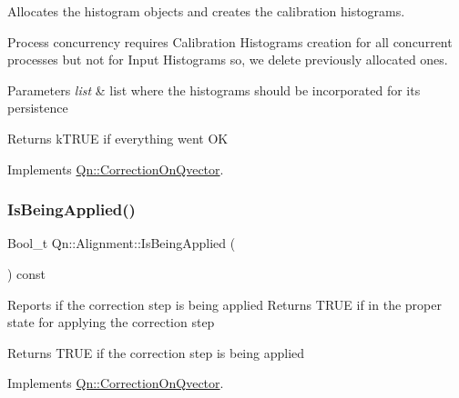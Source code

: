 Allocates the histogram objects and creates the calibration histograms.

Process concurrency requires Calibration Histograms creation for all concurrent processes but not for Input Histograms so, we delete previously allocated ones. 
\begin{DoxyParams}{Parameters}
{\em list} & list where the histograms should be incorporated for its persistence \\
\hline
\end{DoxyParams}
\begin{DoxyReturn}{Returns}
k\+T\+R\+UE if everything went OK 
\end{DoxyReturn}


Implements \mbox{\hyperlink{classQn_1_1CorrectionOnQvector_addcdd98787c99ea34a2511be2cdc8de4}{Qn\+::\+Correction\+On\+Qvector}}.

\mbox{\label{classQn_1_1Alignment_aaa38151d72ebf1aa97247ba07c4d16e5}} 
\subsubsection{\texorpdfstring{Is\+Being\+Applied()}{IsBeingApplied()}}
{\footnotesize\ttfamily Bool\+\_\+t Qn\+::\+Alignment\+::\+Is\+Being\+Applied (\begin{DoxyParamCaption}{ }\end{DoxyParamCaption}) const\hspace{0.3cm}{\ttfamily [virtual]}}

Reports if the correction step is being applied Returns T\+R\+UE if in the proper state for applying the correction step \begin{DoxyReturn}{Returns}
T\+R\+UE if the correction step is being applied 
\end{DoxyReturn}


Implements \mbox{\hyperlink{classQn_1_1CorrectionOnQvector_a4d47a1c241b4bfd5ac98d6fdbc90eb79}{Qn\+::\+Correction\+On\+Qvector}}.

\mbox{\label{classQn_1_1Alignment_a57b815d9ce4d0ae4f94ff6cb46eb2514}} 
